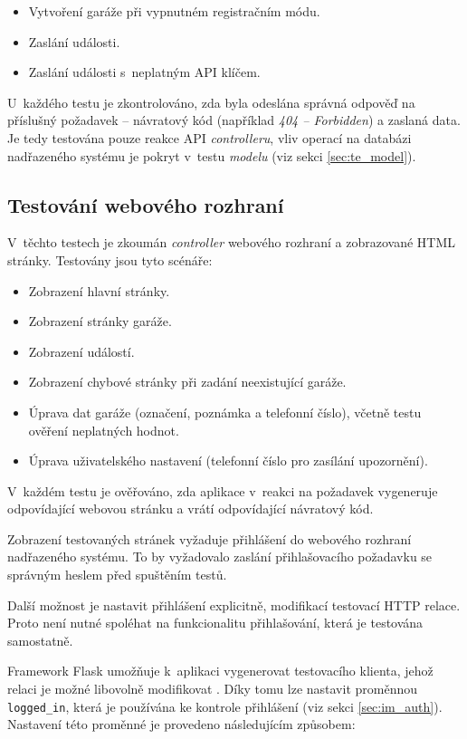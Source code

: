 \begin{itemize}
    \item Vytvoření garáže při vypnutném registračním módu.
    \item Zaslání události.
    \item Zaslání události s~neplatným API klíčem.
\end{itemize}

U~každého testu je zkontrolováno, zda byla odeslána správná odpověď na příslušný požadavek -- návratový kód (například \textit{404 -- Forbidden}) a zaslaná data. Je tedy testována pouze reakce API \textit{controlleru}, vliv operací na databázi nadřazeného systému je pokryt v~testu \textit{modelu} (viz sekci \ref{sec:te_model}).

\subsection{Testování webového rozhraní}

V~těchto testech je zkoumán \textit{controller} webového rozhraní a zobrazované HTML stránky. Testovány jsou tyto scénáře:

\begin{itemize}
    \item Zobrazení hlavní stránky.
    \item Zobrazení stránky garáže.
    \item Zobrazení událostí.
    \item Zobrazení chybové stránky při zadání neexistující garáže.
    \item Úprava dat garáže (označení, poznámka a telefonní číslo), včetně testu ověření neplatných hodnot.
    \item Úprava uživatelského nastavení (telefonní číslo pro zasílání upozornění).
\end{itemize}

V~každém testu je ověřováno, zda aplikace v~reakci na požadavek vygeneruje odpovídající webovou stránku a vrátí odpovídající návratový kód.

Zobrazení testovaných stránek vyžaduje přihlášení do webového rozhraní nadřazeného systému. To by vyžadovalo zaslání přihlašovacího požadavku se správným heslem před spuštěním testů.

Další možnost je nastavit přihlášení explicitně, modifikací testovací HTTP relace. Proto není nutné spoléhat na funkcionalitu přihlašování, která je testována samostatně.

Framework Flask umožňuje k~aplikaci vygenerovat testovacího klienta, jehož relaci je možné libovolně modifikovat \cite{flask_testing}. Díky tomu lze nastavit proměnnou \texttt{logged\_in}, která je používána ke kontrole přihlášení (viz sekci \ref{sec:im_auth}). Nastavení této proměnné je provedeno následujícím způsobem:

